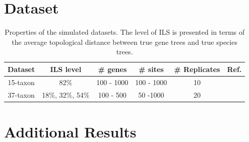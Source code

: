 \documentclass[10pt,a4paper]{article}
\begin{document}
\begin{appendices}



\section{Dataset}
\label{app:dataset}

\begin{table}[htbp]
\caption{Properties of the simulated datasets. The level of ILS is presented in terms of the average topological distance between true gene trees and true species trees.}
\label{table.data-description}
\centering
\begin{tabular}{c c c c c c} 
 \hline
 Dataset & ILS level & \# genes & \# sites & \# Replicates & Ref.\\  [0.5ex]
 \hline\hline
 15-taxon & 82\% & 100 - 1000 & 100 - 1000 & 10 & \cite{bayzid2015weighted}\\
 \hline
 37-taxon & 18\%, 32\%, 54\% & 100 - 500 & 50 -1000 & 20 & \cite{statistical-binning}\\
 \hline
 
\end{tabular}
\end{table}

\section{Additional Results}
\label{app:additional-results}


\end{appendices}
\end{document}
